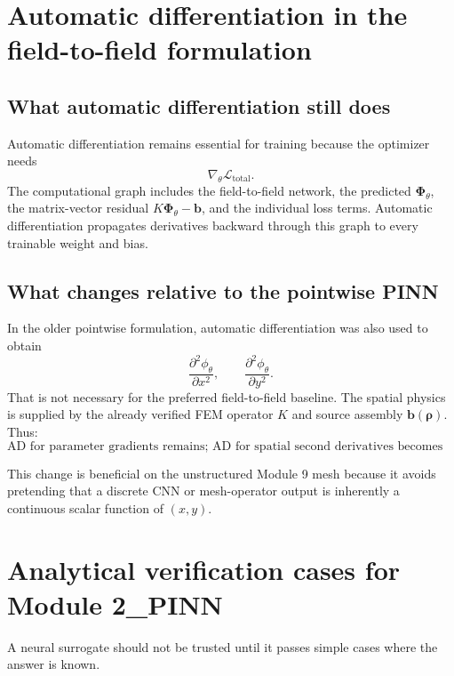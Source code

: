 \documentclass[11pt]{article}
\newcommand{\Ltot}{\mathcal{L}_{\mathrm{total}}}
\begin{document}
\section{Automatic differentiation in the field-to-field formulation}

\subsection{What automatic differentiation still does}

Automatic differentiation remains essential for training because the optimizer needs
\begin{equation}
\nabla_{\theta}\Ltot.
\end{equation}
The computational graph includes the field-to-field network, the predicted $\bm{\Phi}_{\theta}$, the matrix-vector residual $K\bm{\Phi}_{\theta}-\bm{b}$, and the individual loss terms. Automatic differentiation propagates derivatives backward through this graph to every trainable weight and bias.

\subsection{What changes relative to the pointwise PINN}

In the older pointwise formulation, automatic differentiation was also used to obtain
\begin{equation}
\frac{\partial^2\phi_{\theta}}{\partial x^2},\qquad
\frac{\partial^2\phi_{\theta}}{\partial y^2}.
\end{equation}
That is not necessary for the preferred field-to-field baseline. The spatial physics is supplied by the already verified FEM operator $K$ and source assembly $\bm{b}(\bm{\rho})$. Thus:
\begin{equation}
\boxed{
\text{AD for parameter gradients remains; AD for spatial second derivatives becomes optional.}
}
\end{equation}

This change is beneficial on the unstructured Module 9 mesh because it avoids pretending that a discrete CNN or mesh-operator output is inherently a continuous scalar function of $(x,y)$.

\section{Analytical verification cases for Module 2\_PINN}

A neural surrogate should not be trusted until it passes simple cases where the answer is known.
\end{document}

